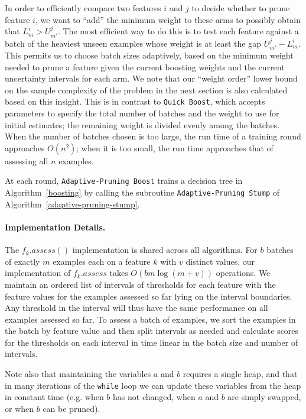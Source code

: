 In order to efficiently compare two features $i$ and $j$ to decide whether
to prune feature $i$,
we want to ``add'' the minimum weight to these arms to
possibly obtain that $L_m^i > U_{m'}^j$.
The most efficient way to do this is to test each feature against
a batch of the heaviest unseen examples whose weight is at least
the gap $U_{m'}^j - L_m^i$.
This permits us to choose batch sizes adaptively, based on the minimum weight
needed to prune a feature given the current boosting weights and the
current uncertainty intervals for each arm.
We note that our ``weight order'' lower bound on the sample complexity of the
problem in the next section is also calculated based on this insight.
This is in contrast to \texttt{Quick Boost}, which accepts parameters to
specify the total number of batches and the weight to use for initial estimates;
the remaining weight is divided evenly among the batches.
When the number of batches chosen is too large, the run time of a training
round approaches $O(n^2)$; when it is too small, the run time approaches
that of assessing all $n$ examples.

At each round, \texttt{Adaptive-Pruning Boost} trains a decision tree
in Algorithm~\ref{boosting} by calling the subroutine
\texttt{Adaptive-Pruning Stump} of Algorithm~\ref{adaptive-pruning-stump}.

\paragraph{Implementation Details.}
The $f_k.assess()$ implementation is shared across all algorithms.
 For $b$ batches of exactly $m$ examples each on a feature $k$ with $v$ distinct
 values, our implementation of $f_k.assess$ takes $O(b m \log (m + v))$
 operations.
 We maintain an ordered list of intervals of thresholds for each feature with
 the feature values for the examples assessed so far lying on the interval
 boundaries.
 Any threshold in the interval will thus have the same performance on all
 examples assessed so far.
 To assess a batch of examples, we sort the examples in the batch by feature
 value and then split intervals as needed and calculate scores for the
 thresholds on each interval in time linear in the batch size and number of
 intervals.

Note also that maintaining the variables $a$ and $b$ requires a
single heap, and that in many iterations of the \texttt{while} loop we can
update these variables from the heap in constant time
(e.g. when $b$ has not changed, when $a$ and $b$ are simply swapped,
or when $b$ can be pruned).


